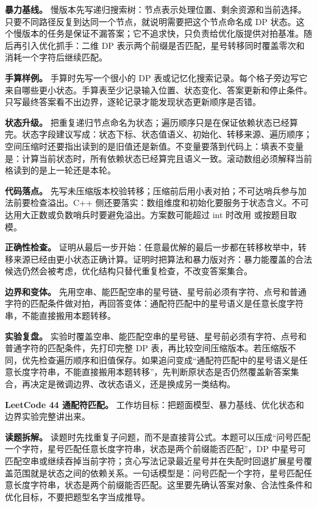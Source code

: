 \textbf{暴力基线。} 慢版本先写递归搜索树：节点表示处理位置、剩余资源和当前选择。只要不同路径反复到达同一个节点，就说明需要把这个节点命名成 DP 状态。这个慢版本的任务是保证不漏答案；它不追求快，只负责给优化版提供对拍基准。随后再引入优化抓手：二维 DP 表示两个前缀是否匹配，星号转移同时覆盖零次和消耗一个字符后继续匹配。

\textbf{手算样例。} 手算时先写一个很小的 DP 表或记忆化搜索记录。每个格子旁边写它来自哪些更小状态。手算表至少记录输入位置、状态变化、答案更新和停止条件。只写最终答案看不出边界，逐轮记录才能发现状态更新顺序是否错。

\textbf{状态升级。} 把重复递归节点命名为状态；遍历顺序只是在保证依赖状态已经算完。状态字段建议写成：状态下标、状态值语义、初始化、转移来源、遍历顺序；空间压缩时还要指出读到的是旧值还是新值。不变量要落到代码上：填表不变量是：计算当前状态时，所有依赖状态已经算完且语义一致。滚动数组必须解释当前格读到的是上一轮还是本轮。

\textbf{代码落点。} 先写未压缩版本校验转移；压缩前后用小表对拍；不可达哨兵参与加法前要检查溢出。C++ 侧还要落实：数组维度和初始化要服务于状态含义。不可达用大正数或负数哨兵时要避免溢出。方案数可能超过 int 时改用  或按题目取模。

\textbf{正确性检查。} 证明从最后一步开始：任意最优解的最后一步都在转移枚举中，转移来源已经由更小状态正确计算。证明时把算法和暴力版对齐：暴力能覆盖的合法候选仍然会被考虑，优化结构只替代重复检查，不改变答案集合。

\textbf{边界和变体。} 先用空串、能匹配空串的星号链、星号前必须有字符、点号和普通字符的匹配条件做对拍，再回答变体：通配符匹配中的星号语义是任意长度字符串，不能直接搬用本题转移。

\textbf{实验复盘。} 实验时覆盖空串、能匹配空串的星号链、星号前必须有字符、点号和普通字符的匹配条件，先打印完整 DP 表，再比较空间压缩版本。若压缩版不同，优先检查遍历顺序和旧值保存。如果追问变成“通配符匹配中的星号语义是任意长度字符串，不能直接搬用本题转移”，先判断原状态是否仍然覆盖新答案集合，再决定是微调边界、改状态语义，还是换成另一类结构。

\noindent\textbf{LeetCode 44 通配符匹配。} 工作坊目标：把题面模型、暴力基线、优化状态和边界实验完整讲出来。

\textbf{读题拆解。} 读题时先找重复子问题，而不是直接背公式。本题可以压成“问号匹配一个字符，星号匹配任意长度字符串，状态是两个前缀能否匹配”，DP 中星号可匹配空串或继续吞掉当前字符；贪心写法记录最近星号并在失配时回退扩展星号覆盖范围就是状态之间的依赖关系。一句话模型是：问号匹配一个字符，星号匹配任意长度字符串，状态是两个前缀能否匹配。这里要先确认答案对象、合法性条件和优化目标，不要把题型名字当成推导。

